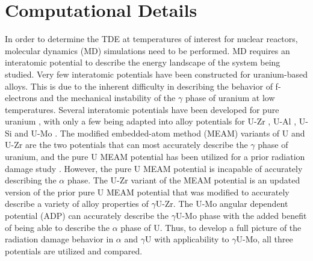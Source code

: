 \documentclass[review]{elsarticle}
\begin{document}
\section{Computational Details}
In order to determine the TDE at temperatures of interest for nuclear reactors, molecular dynamics (MD) \cite{abraham1986, allen1987} simulations need to be performed. MD requires an interatomic potential to describe the energy landscape of the system being studied. Very few interatomic potentials have been constructed for uranium-based alloys. This is due to the inherent difficulty in describing the behavior of f-electrons and the mechanical instability of the $\gamma$ phase of uranium at low temperatures. Several interatomic potentials have been developed for pure uranium \cite{beeler_meam, beelerASTM, fernandez2014, li2011, smirnova2012, li2012}, with only a few being adapted into alloy potentials for U-Zr \cite{moore2015}, U-Al \cite{pascuet2012}, U-Si \cite{beelerUSi} and U-Mo \cite{smirnovaUMo}. The modified embedded-atom method (MEAM) variants of U and U-Zr \cite{beeler_meam, moore2015} are the two potentials that can most accurately describe the $\gamma$ phase of uranium, and the pure U MEAM potential \cite{beeler_meam} has been utilized for a prior radiation damage study \cite{miao2015}. However, the pure U MEAM potential is incapable of accurately describing the $\alpha$ phase. The U-Zr variant of the MEAM potential is an updated version of the prior pure U MEAM potential that was modified to accurately describe a variety of alloy properties of $\gamma$U-Zr. The U-Mo angular dependent potential (ADP) \cite{smirnovaADP} can accurately describe the $\gamma$U-Mo phase with the added benefit of being able to describe the $\alpha$ phase of U. Thus, to develop a full picture of the radiation damage behavior in $\alpha$ and $\gamma$U with applicability to $\gamma$U-Mo, all three potentials are utilized and compared.
\end{document}
